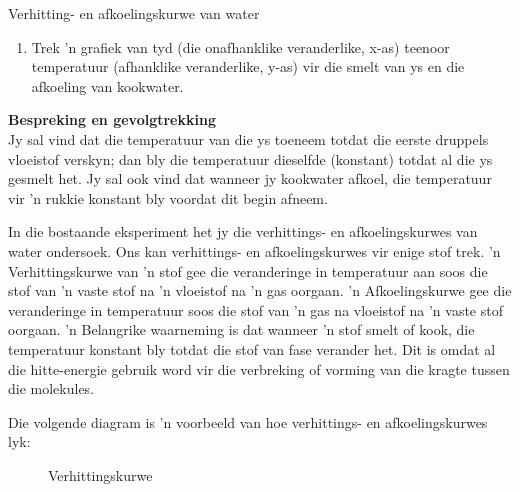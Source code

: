 \begin{f_experiment}{Verhitting- en afkoelingskurwe van water}
{\begin{enumerate}[noitemsep, label=\textbf{\arabic*}.]
\begin{table}[H]
\begin{center}
\begin{tabular}{|l|l|l|l|}
    \end{tabular}
      \end{center}
\end{table}
\item Trek  'n grafiek van tyd (die onafhanklike veranderlike, x-as) teenoor temperatuur (afhanklike veranderlike, y-as) vir die smelt van ys en die afkoeling van kookwater.
\end{enumerate}
\par   
\label{m38736*eip-864}\noindent{}\textbf{Bespreking en gevolgtrekking}\\
Jy sal vind dat die temperatuur van die ys toeneem totdat die eerste druppels vloeistof
verskyn; dan bly die temperatuur dieselfde (konstant) totdat al die ys gesmelt het. Jy sal ook
vind dat wanneer jy kookwater afkoel, die temperatuur vir  'n rukkie konstant bly voordat dit
begin afneem.}
\end{f_experiment} 
\par \label{m38736*eip-25}In die bostaande eksperiment het jy die verhittings- en afkoelingskurwes van water ondersoek. Ons kan
verhittings- en afkoelingskurwes vir enige stof trek.  'n Verhittingskurwe van  'n stof gee die veranderinge
in temperatuur aan soos die stof van  'n vaste stof na  'n vloeistof na  'n gas oorgaan.  'n Afkoelingskurwe gee
die veranderinge in temperatuur soos die stof van   'n gas na vloeistof na  'n vaste stof oorgaan.  'n Belangrike
waarneming is dat wanneer  'n stof smelt of kook, die temperatuur konstant bly totdat die stof van fase verander
het. Dit is omdat al die hitte-energie gebruik word vir die verbreking of vorming van die kragte tussen die molekules.  \par 
Die volgende diagram is  'n voorbeeld van hoe verhittings- en afkoelingskurwes lyk: \par
\begin{minipage}{0.5\textwidth}
\begin{figure}[H]
 \begin{center}
\end{center}
\caption{Verhittingskurwe}
\end{figure}
\end{minipage}
